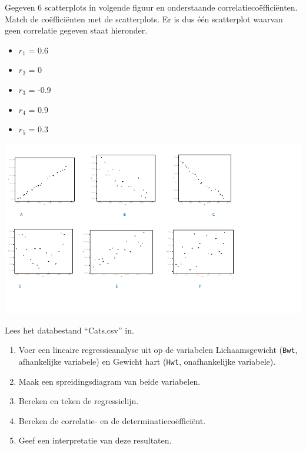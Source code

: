 \begin{exercise}
  \label{ex:scatter-correlatiecoeff}
	Gegeven 6 scatterplots in volgende figuur en onderstaande correlatieco\"effici\"enten. Match de co\"effici\"enten met de scatterplots. Er is dus één scatterplot waarvan geen correlatie gegeven staat hieronder.
\begin{itemize}
	\item $r_{1}$ = 0.6
	\item $r_{2}$ = 0
	\item $r_{3}$ = -0.9
	\item $r_{4}$ = 0.9
	\item $r_{5}$ = 0.3
\end{itemize}
	\includegraphics[width=1.10\textwidth]{images/correlaties.png}
	\label{fig:correlaties}
\end{exercise}

\begin{exercise}
	\label{ex:cats}
	Lees het databestand ``Cats.csv'' in. 
		\begin{enumerate}
		\item Voer een lineaire regressieanalyse uit op de variabelen Lichaamsgewicht (\texttt{Bwt}, afhankelijke variabele) en Gewicht hart (\texttt{Hwt}, onafhankelijke variabele).
		\item Maak een spreidingsdiagram van beide variabelen.
		\item Bereken en teken de regressielijn.
		\item Bereken de correlatie- en de determinatiecoëfficiënt.
		\item Geef een interpretatie van deze resultaten.
	\end{enumerate}
\end{exercise}

